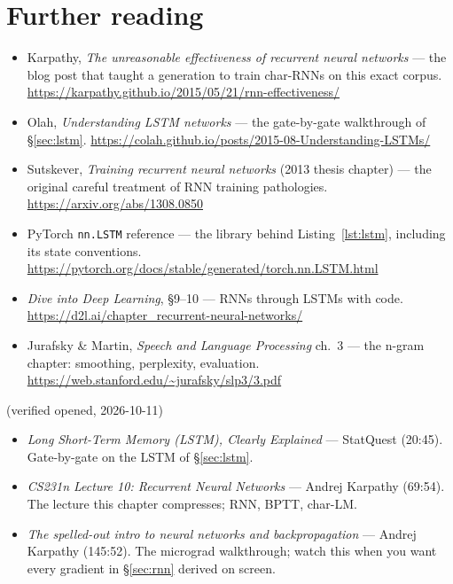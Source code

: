 \section*{Further reading}
\begin{itemize}
\item Karpathy, \emph{The unreasonable effectiveness of recurrent
neural networks} --- the blog post that taught a generation to train
char-RNNs on this exact corpus.
\url{https://karpathy.github.io/2015/05/21/rnn-effectiveness/}
\item Olah, \emph{Understanding LSTM networks} --- the gate-by-gate
walkthrough of \S\ref{sec:lstm}.
\url{https://colah.github.io/posts/2015-08-Understanding-LSTMs/}
\item Sutskever, \emph{Training recurrent neural networks} (2013
thesis chapter) --- the original careful treatment of RNN training
pathologies.
\url{https://arxiv.org/abs/1308.0850}
\item PyTorch \texttt{nn.LSTM} reference --- the library behind
Listing~\ref{lst:lstm}, including its state conventions.
\url{https://pytorch.org/docs/stable/generated/torch.nn.LSTM.html}
\item \emph{Dive into Deep Learning}, \S9--10 --- RNNs through LSTMs
with code.
\url{https://d2l.ai/chapter_recurrent-neural-networks/}
\item Jurafsky \& Martin, \emph{Speech and Language Processing} ch.\
3 --- the n-gram chapter: smoothing, perplexity, evaluation.
\url{https://web.stanford.edu/~jurafsky/slp3/3.pdf}
\end{itemize}

\begin{rulebox}
(verified opened, 2026-10-11)
\begin{itemize}
\item \emph{Long Short-Term Memory (LSTM), Clearly Explained} ---
StatQuest (20:45). Gate-by-gate on the LSTM of \S\ref{sec:lstm}.
\item \emph{CS231n Lecture 10: Recurrent Neural Networks} --- Andrej
Karpathy (69:54). The lecture this chapter compresses; RNN, BPTT,
char-LM.
\item \emph{The spelled-out intro to neural networks and
backpropagation} --- Andrej Karpathy (145:52). The micrograd
walkthrough; watch this when you want every gradient in
\S\ref{sec:rnn} derived on screen.
\end{itemize}
\end{rulebox}

